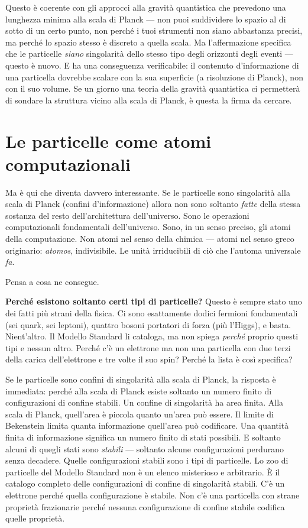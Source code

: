 \documentclass[11pt, twoside, openright]{book}
\begin{document}
Questo è coerente con gli approcci alla gravità quantistica che prevedono una lunghezza minima alla scala di Planck --- non puoi suddividere lo spazio al di sotto di un certo punto, non perché i tuoi strumenti non siano abbastanza precisi, ma perché lo spazio stesso è discreto a quella scala. Ma l'affermazione specifica che le particelle \textit{siano} singolarità dello stesso tipo degli orizzonti degli eventi --- questo è nuovo. E ha una conseguenza verificabile: il contenuto d'informazione di una particella dovrebbe scalare con la sua superficie (a risoluzione di Planck), non con il suo volume. Se un giorno una teoria della gravità quantistica ci permetterà di sondare la struttura vicino alla scala di Planck, è questa la firma da cercare.

\section*{Le particelle come atomi computazionali}

Ma è qui che diventa davvero interessante. Se le particelle sono singolarità alla scala di Planck (confini d'informazione) allora non sono soltanto \textit{fatte} della stessa sostanza del resto dell'architettura dell'universo. Sono le operazioni computazionali fondamentali dell'universo. Sono, in un senso preciso, gli atomi della computazione. Non atomi nel senso della chimica --- atomi nel senso greco originario: \textit{atomos}, indivisibile. Le unità irriducibili di ciò che l'automa universale \textit{fa}.

Pensa a cosa ne consegue.

\textbf{Perché esistono soltanto certi tipi di particelle?} Questo è sempre stato uno dei fatti più strani della fisica. Ci sono esattamente dodici fermioni fondamentali (sei quark, sei leptoni), quattro bosoni portatori di forza (più l'Higgs), e basta. Nient'altro. Il Modello Standard li cataloga, ma non spiega \textit{perché} proprio questi tipi e nessun altro. Perché c'è un elettrone ma non una particella con due terzi della carica dell'elettrone e tre volte il suo spin? Perché la lista è così specifica?

Se le particelle sono confini di singolarità alla scala di Planck, la risposta è immediata: perché alla scala di Planck esiste soltanto un numero finito di configurazioni di confine stabili. Un confine di singolarità ha area finita. Alla scala di Planck, quell'area è piccola quanto un'area può essere. Il limite di Bekenstein limita quanta informazione quell'area può codificare. Una quantità finita di informazione significa un numero finito di stati possibili. E soltanto alcuni di quegli stati sono \textit{stabili} --- soltanto alcune configurazioni perdurano senza decadere. Quelle configurazioni stabili sono i tipi di particelle. Lo zoo di particelle del Modello Standard non è un elenco misterioso e arbitrario. È il catalogo completo delle configurazioni di confine di singolarità stabili. C'è un elettrone perché quella configurazione è stabile. Non c'è una particella con strane proprietà frazionarie perché nessuna configurazione di confine stabile codifica quelle proprietà.
\end{document}
